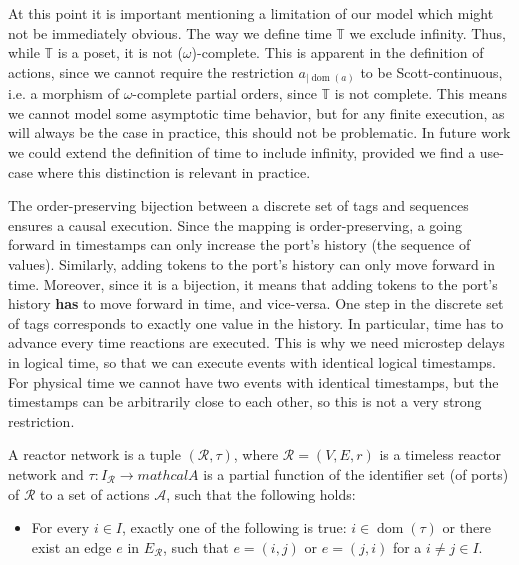 \begin{defn}
\begin{defn}
\begin{defn}
\begin{defn}
At this point it is important mentioning a limitation of our model which might not be immediately obvious.
The way we define time $\mathbb{T}$ we exclude infinity. Thus, while $\mathbb{T}$ is a \ac{poset}, it is not ($\omega$)-complete.
This is apparent in the definition of actions, since we cannot require the restriction $a_{\big| \operatorname{dom}(a)}$ to be Scott-continuous, i.e. a morphism of $\omega$-complete partial orders, since $\mathbb{T}$ is not complete. 
This means we cannot model some asymptotic time behavior, but for any finite execution, as will always be the case in practice, this should not be problematic.
In future work we could extend the definition of time to include infinity, provided we find a use-case where this distinction is relevant in practice.

The order-preserving bijection between a discrete set of tags and sequences ensures a causal execution.
Since the mapping is order-preserving, a going forward in timestamps can only increase the port's history (the sequence of values).
Similarly, adding tokens to the port's history can only move forward in time. 
Moreover, since it is a bijection, it means that adding tokens to the port's history \textbf{has} to move forward in time, and vice-versa.
One step in the discrete set of tags corresponds to exactly one value in the history.
In particular, time has to advance every time reactions are executed. 
This is why we need microstep delays in logical time, so that we can execute events with identical logical timestamps.
For physical time we cannot have two events with identical timestamps, but the timestamps can be arbitrarily close to each other, so this is not a very strong restriction.

\begin{defn}
    \label{defn:reactor_network}
    A reactor network is a tuple $(\mathcal{R},\tau)$, where $\mathcal{R} = (V,E,r)$ is a timeless reactor network and $\tau : I_\mathcal{R} \rightarrow mathcal{A}$ is a partial function of the identifier set (of ports) of $\mathcal{R}$ to a set of actions $\mathcal{A}$, such that the following holds:
    \begin{itemize}
        \item For every $i \in I$, exactly one of the following is true: $i \in \operatorname{dom}(\tau)$ or there exist an edge $e$ in $E_{\mathcal{R}}$, such that $e = (i,j)$ or $e = (j,i)$ for a $i \neq j \in I$.
    \end{itemize}
\end{defn}


\end{defn}
\end{defn}
\end{defn}
\end{defn}
